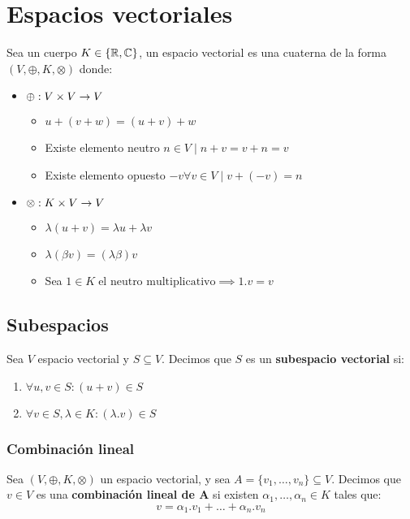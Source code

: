 \section*{Espacios vectoriales}
Sea un cuerpo \(K \in \{\mathbb{R},\mathbb{C}\}\), un espacio vectorial es una cuaterna de la forma \(\left(V,\oplus,K,\otimes\right)\) donde:
\begin{itemize}
    \item \(\oplus : V \times V \to V\)
    \begin{itemize}
        \item \(u + (v + w) = (u+v) + w\)
        \item Existe elemento neutro \(n \in V \; \big| \; n +v = v+n = v\)
        \item Existe elemento opuesto \(-v \forall v \in V \; \big| \; v + (-v) = n\)
    \end{itemize}
    
    \item \(\otimes: K \times V \to V\)
    \begin{itemize}
        \item \(\lambda(u+v) = \lambda u + \lambda v\)
        \item \(\lambda(\beta v) = (\lambda \beta) v\)
        \item Sea \(1 \in K \; \text{el neutro multiplicativo} \implies 1.v = v\)
    \end{itemize}
    
\end{itemize}
\subsection*{Subespacios}
Sea \(V\) espacio vectorial y \(S \subseteq V\). Decimos que \(S\) es un \textbf{subespacio vectorial} si:
\begin{enumerate}
    \item \(\forall u,v \in S : (u+v) \in S\)
    \item \(\forall v \in S, \lambda \in K: (\lambda . v) \in S\)
\end{enumerate}
\subsubsection*{Combinación lineal}
Sea \((V,\oplus,K,\otimes)\) un espacio vectorial, y sea \(A = \{v_1,\dots,v_n\} \subseteq V\). Decimos que \(v\in V\) es una \textbf{combinación lineal de A} si existen \(\alpha_1,\dots,\alpha_n \in K\) tales que:
\[v = \alpha_1.v_1 + \dots + \alpha_n . v_n\] 

